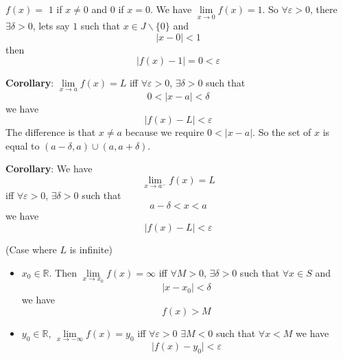 \documentclass{report}
\begin{document}
\begin{examples}
    \begin{example}
        $f(x) = $ $1$ if $x \neq 0$ and $0$ if $x = 0$. We have $\lim\limits_{x \to 0}f(x) = 1$. So $\forall \varepsilon> 0$, there $ \exists \delta> 0$, lets say $1$ such that $x \in J\backslash \{0\}$ and 
            \begin{equation*}
                \lvert x - 0 \rvert < 1
            \end{equation*}
        then 
            \begin{equation*}
                 \lvert f(x) - 1 \rvert = 0< \varepsilon
            \end{equation*} 
    \end{example}
\end{examples}

\textbf{Corollary}: $\lim\limits_{x \to a}f(x) = L$ iff $\forall \varepsilon> 0$, $\exists \delta> 0$ such that 
    \begin{equation*}
        0 < \lvert x - a \rvert< \delta
    \end{equation*}
we have
    \begin{equation*}
        \lvert f(x) - L \rvert < \varepsilon
    \end{equation*}
The difference is that $x \neq a$ because we require $0 < \lvert x - a\rvert$. So the set of $x$ is equal to $(a - \delta, a) \cup (a, a + \delta)$.

\textbf{Corollary}: We have
    \begin{equation*}
        \lim\limits_{x \to a^{-}}f(x) = L
    \end{equation*}
iff $\forall \varepsilon> 0$, $\exists \delta> 0$ such that 
    \begin{equation*}
        a - \delta < x <  a
    \end{equation*}
we have
    \begin{equation*}
        \lvert f(x) - L \rvert < \varepsilon
    \end{equation*}

(Case where $L$ is infinite) 
    \begin{itemize}
        \item $x_{0} \in \mathbb{R}$. Then $\lim\limits_{x \to x_{0}}f(x) = \infty$ iff $\forall M> 0$, $\exists \delta> 0$ such that $\forall x \in S$ and 
            \begin{equation*}
                \lvert x - x_{0} \rvert < \delta
            \end{equation*}
        we have
            \begin{equation*}
                f(x) > M
            \end{equation*}

        \item $y_{0} \in \mathbb{R}$, $\lim\limits_{x \to -\infty} f(x) = y_{0}$ iff $\forall \varepsilon>0$ $\exists M < 0$ such that $\forall x < M$ we have
            \begin{equation*}
                \lvert f(x) - y_{0} \rvert < \varepsilon
            \end{equation*}
    \end{itemize}
\end{document}

